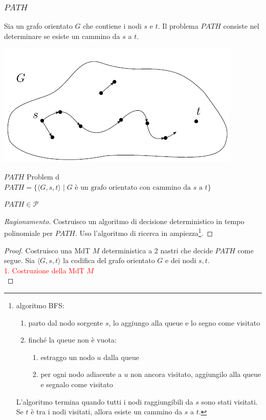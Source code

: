 \documentclass{article}  %
\theoremstyle{definition}
\newenvironment{ragionamento}[1][]
  {\begin{proof}[Ragionamento#1]\renewcommand{\qedsymbol}{}\normalfont}
  {\end{proof}}
\begin{document}
\subsubsection{$PATH$}
Sia un grafo orientato $G$ che contiene i nodi $s$ e $t$. Il problema $PATH$ consiste nel determinare se esiste un cammino da $s$ a $t$.
\begin{center}
	\includegraphics[width=0.4\linewidth]{path-problem.png}
\end{center}
\begin{theorem}{$PATH$ Problem}
	d$PATH = \{\langle G, s, t \rangle \mid G \text{ è un grafo orientato con cammino da } s \text{ a } t\}$
	\begin{center}
		$PATH \in \mathcal{P}$
	\end{center}
	\footnotesize
	\begin{ragionamento}
		Costruisco un algoritmo di decisione deterministico in tempo polinomiale per $PATH$. Uso l'algoritmo di ricerca in ampiezza\footnote{algoritmo BFS:
			\begin{enumerate}
				\item parto dal nodo sorgente $s$, lo aggiungo alla queue e lo segno come visitato
				\item finché la queue non è vuota:
				      \begin{enumerate}
					      \item estraggo un nodo $u$ dalla queue
					      \item per ogni nodo adiacente a $u$ non ancora visitato, aggiungilo alla queue e segnalo come visitato
				      \end{enumerate}
			\end{enumerate}
			L'algoritmo termina quando tutti i nodi raggiungibili da $s$ sono stati visitati. Se $t$ è tra i nodi visitati, allora esiste un cammino da $s$ a $t$.
		}.
	\end{ragionamento}
	\begin{proof}
		Costruisco una MdT $M$ deterministica a 2 nastri che decide $PATH$ come segue. Sia $\langle G, s, t\rangle$ la codifica del grafo orientato $G$ e dei nodi $s, t$.\\
		\textcolor{red}{1. Costruzione della MdT $M$} \\

\end{proof}
\end{theorem}
\end{document}
